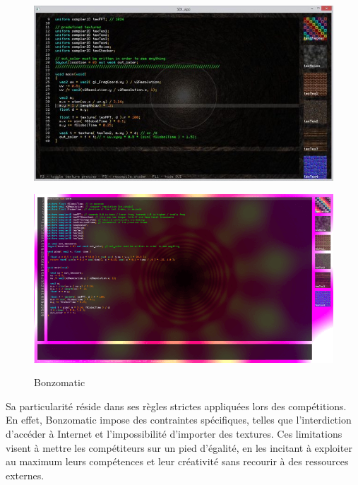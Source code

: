 \begin{figure}[h]
  \begin{minipage}[b]{0.45\linewidth}
    \centering
    \includegraphics[width=\linewidth]{images/livecoding/outilsshad00.jpeg}
    \label{outilsshad00}
  \end{minipage}
  \hfill
  \begin{minipage}[b]{0.45\linewidth}
    \centering
    \includegraphics[width=\linewidth]{images/livecoding/outilsshad01.png}
    \label{outilsshad01}
  \end{minipage}
  \caption{Bonzomatic}
\end{figure}

Sa particularité réside dans ses règles strictes appliquées lors des compétitions. En effet, Bonzomatic impose des contraintes spécifiques, telles que l'interdiction d'accéder à Internet et l'impossibilité d'importer des textures. Ces limitations visent à mettre les compétiteurs sur un pied d'égalité, en les incitant à exploiter au maximum leurs compétences et leur créativité sans recourir à des ressources externes.



